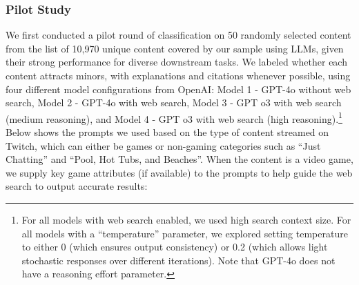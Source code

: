 \documentclass[a4paper,12pt]{article}
\begin{document}
\subsubsection{Pilot Study}\label{appendix-minor-content-pilot}
We first conducted a pilot round of classification on 50 randomly selected content from the list of 10,970 unique content covered by our sample using LLMs, given their strong performance for diverse downstream tasks. We labeled whether each content attracts minors, with explanations and citations whenever possible, using four different model configurations from OpenAI: Model 1 - GPT-4o without web search, Model 2 - GPT-4o with web search, Model 3 - GPT o3 with web search (medium reasoning), and Model 4 - GPT o3 with web search (high reasoning).\footnote{For all models with web search enabled, we used high search context size. For all models with a ``temperature'' parameter, we explored setting temperature to either 0 (which ensures output consistency) or 0.2 (which allows light stochastic responses over different iterations).
Note that GPT-4o does not have a reasoning effort parameter.} Below shows the prompts we used based on the type of content streamed on Twitch, which can either be games or non-gaming categories such as ``Just Chatting'' and ``Pool, Hot Tubs, and Beaches''. When the content is a video game, we supply key game attributes (if available) to the prompts to help guide the web search to output accurate results: 
\end{document}
